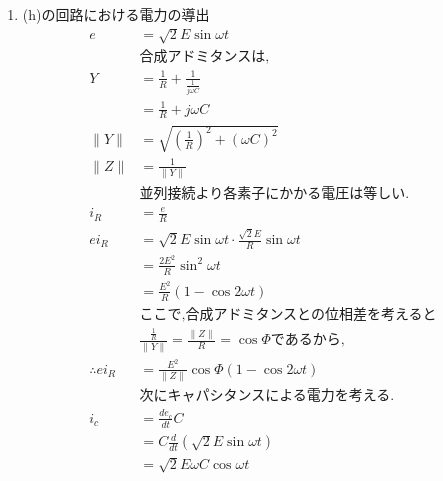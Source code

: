 \documentclass[twocolumn]{article}
\begin{document}
\begin{enumerate}
  \item (h)の回路における電力の導出
        \begin{align*}
          e               & = \sqrt{2}E\sin\omega t                                                                 \\
                          & \text{合成アドミタンスは,}                                                                       \\
          Y               & = \frac{1}{R} + \frac{1}{\frac{1}{j\omega C}}                     \\
                          & = \frac{1}{R} + j\omega C                            \\
          \|Y\|           & = \sqrt{{\left(\frac{1}{R}\right)}^2 + {\left(\omega C\right)}^2} \\
          \|Z\|           & = \frac{1}{\|Y\|}                                                                       \\
          & \text{並列接続より各素子にかかる電圧は等しい.}                                                             \\
          i_R             & = \frac{e}{R}                                                                           \\
          ei_R            & = \sqrt{2}E\sin\omega t \cdot \frac{\sqrt{2}E}{R}\sin\omega t                           \\
                          & = \frac{2E^2}{R}\sin^2 \omega t                                                         \\
                          & = \frac{E^2}{R}\left(1 - \cos 2 \omega t\right)                                         \\
                          & \text{ここで,合成アドミタンスとの位相差を考えると}                                                           \\
                          & \frac{\frac{1}{R}}{\|Y\|} = \frac{\|Z\|}{R} = \cos \Phi\text{であるから,}                    \\
          \therefore ei_R & = \frac{E^2}{\|Z\|}\cos \Phi\left(1 - \cos 2 \omega t\right)\\
          &\text{次にキャパシタンスによる電力を考える.}     \\
          i_c &= \frac{de_c}{dt}C\\
              &= C\frac{d}{dt}\left(\sqrt{2}E\sin\omega t\right)\\
              &= \sqrt{2}E \omega C  \cos\omega t\\

\end{align*}
\end{enumerate}
\end{document}
